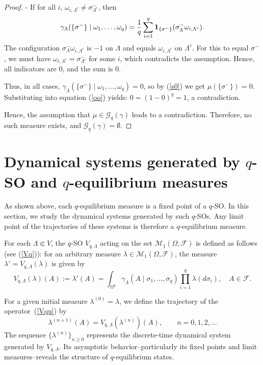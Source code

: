 \documentclass[11pt,reqno]{amsart}
\numberwithin{equation}{section} \setcounter{tocdepth}{1}
\begin{document}
\begin{proof}
- If for all $i$, $\omega_{i,\Lambda^c} \neq \sigma^-_{\Lambda^c}$, then
  $$
  \gamma_\Lambda(\{\sigma^-\} \mid \omega_1, \dots, \omega_q) = {1\over q}\sum_{i=1}^q \mathbf{1}_{\{\sigma^-\}}(\sigma^-_\Lambda \omega_{i,\Lambda^c}).
  $$
  The configuration $\sigma^-_\Lambda \omega_{i,\Lambda^c}$ is $-1$ on $\Lambda$ and equals $\omega_{i,\Lambda^c}$ on $\Lambda^c$. For this to equal $\sigma^-$, we must have $\omega_{i,\Lambda^c} = \sigma^-_{\Lambda^c}$ for some $i$, which contradicts the assumption. Hence, all indicators are 0, and the sum is 0.

Thus, in all cases, $\gamma_\Lambda(\{\sigma^-\} \mid \omega_1, \dots, \omega_q) = 0$, so by (\ref{s0}) we get 
$\mu(\{\sigma^-\}) = 0$. Substituting into equation (\ref{oo}) yields: $0 = (1 - 0)^q = 1$, a contradiction.

Hence, the assumption that $\mu \in \mathcal{G}_q(\gamma)$ leads to a contradiction. 
Therefore, no such measure exists, and $\mathcal{G}_q(\gamma) = \emptyset$.
\end{proof} 

\section{Dynamical systems generated by $q$-SO and $q$-equilibrium measures}

As shown above, each $q$-equilibrium measure is a fixed point of a $q$-SO. In this section, we study the dynamical systems 
generated by such $q$-SOs. Any limit point of the trajectories of these systems 
is therefore a $q$-equilibrium measure. 

\medskip

For each $\Lambda \Subset V$, the $q$-SO $V_{q,\Lambda}$ acting on the set $ \mathcal M_1(\Omega, \mathcal F)$ 
is defined as follows (see (\ref{Vq})): for an arbitrary measure $\lambda \in \mathcal M_1(\Omega, \mathcal F)$, the measure $\lambda' = V_{q, \Lambda}(\lambda)$ is given by
\begin{equation}\label{Vqu}
	V_{q,\Lambda}(\lambda)(A) := \lambda'(A)
	= \int_{\Omega^q} \gamma_\Lambda(A \mid \sigma_{1},\dots, \sigma_{q}) \prod_{i=1}^q \lambda(d\sigma_i),
	\quad A \in \mathcal F.
\end{equation}

For a given initial measure $\lambda^{(0)} = \lambda$, we define the trajectory of the operator~(\ref{Vqu}) by
$$
\lambda^{(n+1)}(A) = V_{q,\Lambda}(\lambda^{(n)})(A), \qquad n = 0,1,2,\dots
$$
The sequence $\{\lambda^{(n)}\}_{n \ge 0}$ represents the discrete-time dynamical system generated by $V_{q,\Lambda}$. 
Its asymptotic behavior--particularly its fixed points and limit measures--reveals the structure of $q$-equilibrium states.
\end{document}
